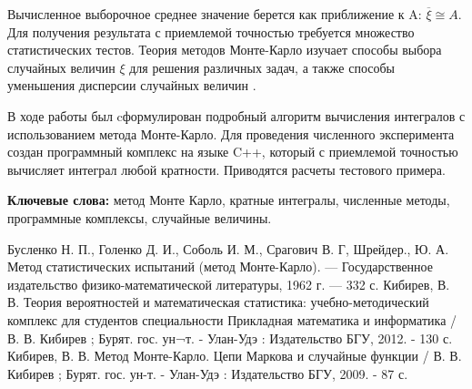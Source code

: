 \documentclass{article}
\begin{document}
	Вычисленное выборочное среднее значение берется как приближение к A: $\overline{\xi}\cong A$. Для получения результата с приемлемой точностью требуется множество статистических тестов. Теория методов Монте-Карло изучает способы выбора случайных величин $\xi$ для решения различных задач, а также способы уменьшения дисперсии случайных величин \cite{litlink3}.
	
	В ходе работы был cформулирован подробный алгоритм вычисления интегралов с использованием метода Монте-Карло. Для проведения численного эксперимента создан программный комплекс на языке C++, который с приемлемой точностью вычисляет интеграл любой кратности. Приводятся расчеты тестового примера.
	
	\textbf{Ключевые слова:} метод Монте Карло, кратные интегралы, численные методы, программные комплексы, случайные величины.
	




\begin{thebibliography}{}
	 Бусленко Н. П., Голенко Д. И., Соболь И. М., Срагович В. Г, Шрейдер., Ю. А. Метод статистических испытаний (метод Монте-Карло). — Государственное издательство физико-математической литературы, 1962 г. — 332 с.
	 Кибирев, В. В. Теория вероятностей и математическая статистика: учебно-методический комплекс для студентов специальности Прикладная математика и информатика / В. В. Кибирев ; Бурят. гос. ун¬т. - Улан-Удэ : Издательство БГУ, 2012. - 130 с.
	 Кибирев, В. В. Метод Монте-Карло. Цепи Маркова и случайные функции / В. В. Кибирев ; Бурят. гос. ун-т. - Улан-Удэ : Издательство БГУ, 2009. - 87 с.
\end{thebibliography}
	
	
	
\end{document}
